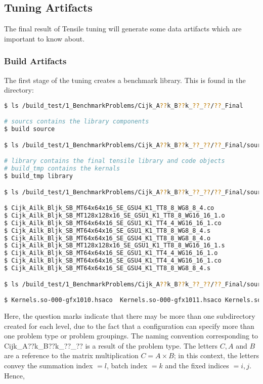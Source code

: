 \documentclass[]{article}
\begin{document}
\subsection{Tuning Artifacts}
The final result of Tensile tuning will generate some data artifacts which are important to know about.

\subsubsection{Build Artifacts}
\label{sec:einstein}

\noindent
The first stage of the tuning creates a benchmark library. This is found in the directory:

\begin{lstlisting}[language=bash,breaklines=true, emph={build,ls,build_tmp,library}, emphstyle=\color{blue}]
$ ls /build_test/1_BenchmarkProblems/Cijk_A??k_B??k_??_??/??_Final

# sourcs contains the library components
$ build source

$ ls /build_test/1_BenchmarkProblems/Cijk_A??k_B??k_??_??/??_Final/source

# library contains the final tensile library and code objects
# build_tmp contains the kernals
$ build_tmp library

$ ls /build_test/1_BenchmarkProblems/Cijk_A??k_B??k_??_??/??_Final/source/build_tmp/SOURCETMP/assembly

$ Cijk_Ailk_Bljk_SB_MT64x64x16_SE_GSU4_K1_TT8_8_WG8_8_4.co
$ Cijk_Ailk_Bljk_SB_MT128x128x16_SE_GSU1_K1_TT8_8_WG16_16_1.o
$ Cijk_Ailk_Bljk_SB_MT64x64x16_SE_GSU1_K1_TT4_4_WG16_16_1.co
$ Cijk_Ailk_Bljk_SB_MT64x64x16_SE_GSU1_K1_TT8_8_WG8_8_4.s
$ Cijk_Ailk_Bljk_SB_MT64x64x16_SE_GSU4_K1_TT8_8_WG8_8_4.o
$ Cijk_Ailk_Bljk_SB_MT128x128x16_SE_GSU1_K1_TT8_8_WG16_16_1.s
$ Cijk_Ailk_Bljk_SB_MT64x64x16_SE_GSU1_K1_TT4_4_WG16_16_1.o
$ Cijk_Ailk_Bljk_SB_MT64x64x16_SE_GSU4_K1_TT4_4_WG16_16_1.co
$ Cijk_Ailk_Bljk_SB_MT64x64x16_SE_GSU4_K1_TT8_8_WG8_8_4.s

$ ls /build_test/1_BenchmarkProblems/Cijk_A??k_B??k_??_??/??_Final/source/library

$ Kernels.so-000-gfx1010.hsaco  Kernels.so-000-gfx1011.hsaco Kernels.so-000-gfx803.hsaco Kernels.so-000-gfx900.hsaco Kernels.so-000-gfx906.hsaco  Kernels.so-000-gfx908.hsaco TensileLibrary_gfx906.co TensileLibrary.yaml

\end{lstlisting}

\noindent
Here, the question marks indicate that there may be more than one subdirectory created for each level, due to the fact that a configuration can specify more than one problem type or problem groupings. The naming convention corresponding to Cijk\_A??k\_B??k\_??\_?? is a result of the problem type. The letters $ C, A $ and $ B $ are a reference to the matrix multiplication $ C = A \times B $; in this context, the letters convey the summation index $= l$, batch index $= k$ and the fixed indices $=i,j$. Hence,
\end{document}
